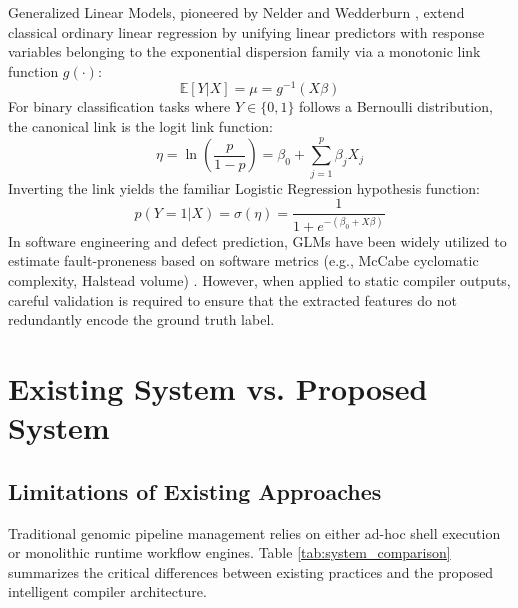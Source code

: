 \documentclass[12pt,a4paper]{article}
\begin{document}
Generalized Linear Models, pioneered by Nelder and Wedderburn \cite{nelder1972}, extend classical ordinary linear regression by unifying linear predictors with response variables belonging to the exponential dispersion family via a monotonic link function $g(\cdot)$:
\begin{equation}
    \mathbb{E}[Y | X] = \mu = g^{-1}(X\beta)
\end{equation}
For binary classification tasks where $Y \in \{0, 1\}$ follows a Bernoulli distribution, the canonical link is the logit link function:
\begin{equation}
    \eta = \ln\left(\frac{p}{1 - p}\right) = \beta_0 + \sum_{j=1}^{p} \beta_j X_j
\end{equation}
Inverting the link yields the familiar Logistic Regression hypothesis function:
\begin{equation}
    p(Y = 1 | X) = \sigma(\eta) = \frac{1}{1 + e^{-(\beta_0 + X\beta)}}
\end{equation}
In software engineering and defect prediction, GLMs have been widely utilized to estimate fault-proneness based on software metrics (e.g., McCabe cyclomatic complexity, Halstead volume) \cite{chidamber1994}. However, when applied to static compiler outputs, careful validation is required to ensure that the extracted features do not redundantly encode the ground truth label.

\newpage

\section{Existing System vs. Proposed System}

\subsection{Limitations of Existing Approaches}

Traditional genomic pipeline management relies on either ad-hoc shell execution or monolithic runtime workflow engines. Table \ref{tab:system_comparison} summarizes the critical differences between existing practices and the proposed intelligent compiler architecture.
\end{document}
